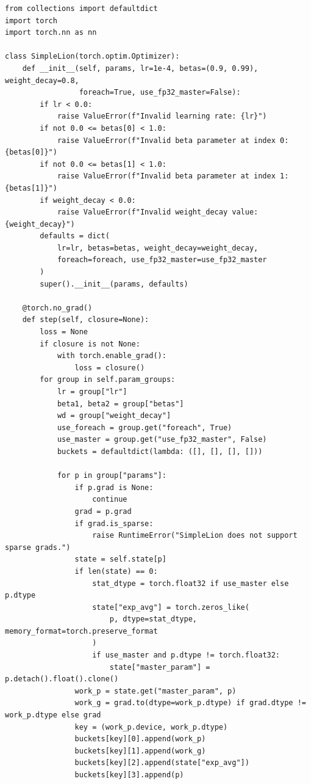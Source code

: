 \documentclass[11pt,a4paper]{article}
\renewcommand{\_}{\origunderscore\allowbreak}
\begin{document}
\begin{lstlisting}[caption={Standard LSO-Eval V-Eval: Vectorized PyTorch SimpleLion Optimizer (Chen et al., NeurIPS 2023, Algorithm 2) \& Decoupled Parameter Grouping}, label={lst:simplelion}]
from collections import defaultdict
import torch
import torch.nn as nn

class SimpleLion(torch.optim.Optimizer):
    def __init__(self, params, lr=1e-4, betas=(0.9, 0.99), weight_decay=0.8,
                 foreach=True, use_fp32_master=False):
        if lr < 0.0:
            raise ValueError(f"Invalid learning rate: {lr}")
        if not 0.0 <= betas[0] < 1.0:
            raise ValueError(f"Invalid beta parameter at index 0: {betas[0]}")
        if not 0.0 <= betas[1] < 1.0:
            raise ValueError(f"Invalid beta parameter at index 1: {betas[1]}")
        if weight_decay < 0.0:
            raise ValueError(f"Invalid weight_decay value: {weight_decay}")
        defaults = dict(
            lr=lr, betas=betas, weight_decay=weight_decay,
            foreach=foreach, use_fp32_master=use_fp32_master
        )
        super().__init__(params, defaults)

    @torch.no_grad()
    def step(self, closure=None):
        loss = None
        if closure is not None:
            with torch.enable_grad():
                loss = closure()
        for group in self.param_groups:
            lr = group["lr"]
            beta1, beta2 = group["betas"]
            wd = group["weight_decay"]
            use_foreach = group.get("foreach", True)
            use_master = group.get("use_fp32_master", False)
            buckets = defaultdict(lambda: ([], [], [], []))

            for p in group["params"]:
                if p.grad is None:
                    continue
                grad = p.grad
                if grad.is_sparse:
                    raise RuntimeError("SimpleLion does not support sparse grads.")
                state = self.state[p]
                if len(state) == 0:
                    stat_dtype = torch.float32 if use_master else p.dtype
                    state["exp_avg"] = torch.zeros_like(
                        p, dtype=stat_dtype, memory_format=torch.preserve_format
                    )
                    if use_master and p.dtype != torch.float32:
                        state["master_param"] = p.detach().float().clone()
                work_p = state.get("master_param", p)
                work_g = grad.to(dtype=work_p.dtype) if grad.dtype != work_p.dtype else grad
                key = (work_p.device, work_p.dtype)
                buckets[key][0].append(work_p)
                buckets[key][1].append(work_g)
                buckets[key][2].append(state["exp_avg"])
                buckets[key][3].append(p)


\end{lstlisting}
\end{document}
